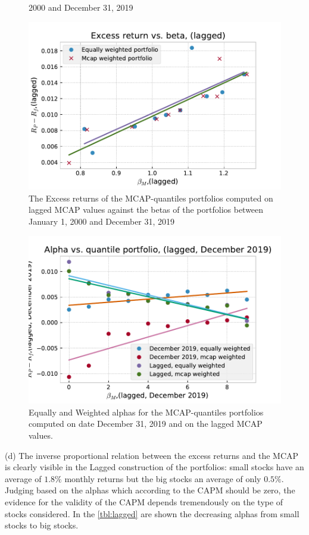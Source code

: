 \documentclass[10pt]{article}
\newenvironment{exercise}[2][Exercise]{\begin{trivlist}
  \item[\hskip \labelsep {\bfseries #1}\hskip \labelsep {\bfseries #2.}]}{\end{trivlist}}
\begin{document}
\begin{exercise}{2}
\begin{figure}[n]
{      2000 and December 31, 2019}
    \label{fig:december2019}
  \end{figure}
  \begin{figure}[H]
    \centering
    \includegraphics[width=0.7\linewidth]{lagged.pdf}
    \caption{The Excess returns of the MCAP-quantiles portfolios computed on
      lagged MCAP values against the betas of the portfolios between January 1,
      2000 and December 31, 2019}
    \label{fig:lagged}
  \end{figure}
  \begin{figure}[H]
    \centering
    \includegraphics[width=0.7\linewidth]{alphas.pdf}
    \caption{Equally and Weighted alphas for the MCAP-quantiles portfolios
      computed on date December 31, 2019 and on the lagged MCAP values.}
    \label{fig:alphas}
  \end{figure}


  (d) The inverse proportional relation between the excess returns and the MCAP
  is clearly visible in the Lagged construction of the portfolios: small stocks
  have an average of $1.8\%$ monthly returns but the big stocks an average of
  only $0.5\%$. Judging based on the alphas which according to the CAPM should
  be zero, the evidence for the validity of the CAPM depends tremendously on the
  type of stocks considered. In the \autoref{tbl:lagged} are shown the
  decreasing alphas from small stocks to big stocks.



\end{exercise}
\end{document}
